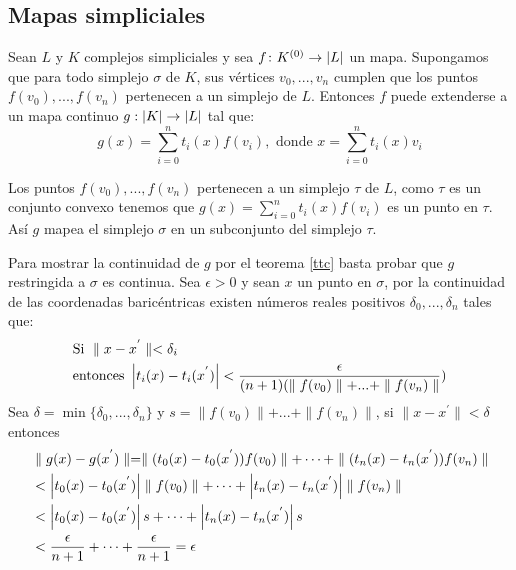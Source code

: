\subsection{Mapas simpliciales}
\begin{Teo} \label{tms}
Sean $L$ y $K$ complejos simpliciales y sea $f\colon K^{(0)} \rightarrow \left| L \right|$ un mapa. Supongamos que  para todo simplejo $\sigma$ de $K$, sus vértices $v_0,...,v_n$ cumplen que los puntos $f(v_0),...,f(v_n)$ pertenecen a un simplejo de $L$.
Entonces $f$ puede extenderse a un mapa continuo $g:\left| K \right|  \rightarrow \left| L \right|$ tal que:
\begin{equation*}
g(x)= \sum_{i=0}^{n}t_i(x)f(v_i), \textrm{ donde }  x= \sum_{i=0}^{n}t_i(x)v_i
\end{equation*}
\end{Teo}
\begin{Dem}

Los puntos $f(v_0),...,f(v_n)$ pertenecen a un simplejo $\tau$ de $L$, como $\tau$ es un conjunto convexo tenemos que $g(x)= \sum_{i=0}^{n}t_i(x)f(v_i)$ es un punto en $\tau$. Así $g$ mapea el simplejo $\sigma$ en un subconjunto del simplejo $\tau$.

Para mostrar la continuidad de $g$ por el teorema \ref{ttc} basta probar que $g$ restringida a $\sigma$ es continua. Sea $\epsilon > 0$ y sean $x$ un punto en $\sigma$, por la continuidad de las coordenadas baricéntricas existen números reales positivos $\delta_{0},...,\delta_{n}$ tales que:
\begin{align*}
&\text{Si }\parallel x-x^{'} \parallel < \delta_{i}\\
&\text{entonces } \left| t_i(x)-t_i(x^{'}) \right|< \frac{\epsilon}{(n+1)(\parallel f(v_0)\parallel + ...+\parallel f(v_n)\parallel})
\end{align*}
Sea $\delta = \min\{\delta_0,...,\delta_n\}$ y $s = \parallel f(v_0)\parallel + ...+\parallel f(v_n)\parallel$, si $\parallel x-x^{'}\parallel< \delta$ entonces
\begin{align*}
&\parallel g(x)-g(x^{'})\parallel = \parallel(t_0(x)-t_0(x^{'}))f(v_0)\parallel+\dots+\parallel(t_n(x)-t_n(x^{'}))f(v_n)\parallel\\
&< \left| t_0(x)-t_0(x^{'}) \right|\parallel f(v_0)\parallel+\dots +  \left| t_n(x)-t_n(x^{'}) \right|\parallel f(v_n)\parallel \\
&< \left| t_0(x)-t_0(x^{'}) \right|s+\dots +  \left| t_n(x)-t_n(x^{'}) \right|s\\
&< \frac{\epsilon}{n+1}+\dots + \frac{\epsilon}{n+1} = \epsilon
\end{align*}
\end{Dem}
